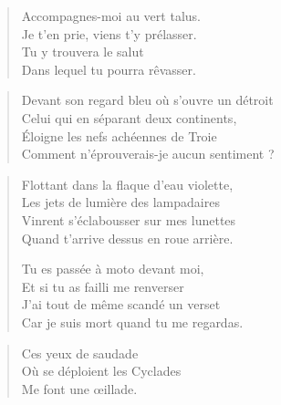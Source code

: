 \begin{verse}
Accompagnes-moi au vert talus.\\
Je t’en prie, viens t’y prélasser.\\
Tu y trouvera le salut\\
Dans lequel tu pourra rêvasser.
\end{verse}

\begin{verse}
Devant son regard bleu où s’ouvre un détroit\\
Celui qui en séparant deux continents,\\
Éloigne les nefs achéennes de Troie\\
Comment n’éprouverais-je aucun sentiment ?
\end{verse}

\begin{verse}
Flottant dans la flaque d’eau violette,\\
Les jets de lumière des lampadaires\\
Vinrent s’éclabousser sur mes lunettes\\
Quand t’arrive dessus en roue arrière.

Tu es passée à moto devant moi,\\
Et si tu as failli me renverser\\
J’ai tout de même scandé un verset\\
Car je suis mort quand tu me regardas.
\end{verse}

\begin{verse}
Ces yeux de saudade\\
Où se déploient les Cyclades\\
Me font une œillade.
\end{verse}

